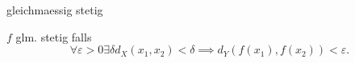 \documentclass[class=article, crop=false]{standalone}
\begin{document}
\begin{zettel}{gleichmaessig stetig}
\begin{flashcard}
    \begin{definition}
        $f$ glm. stetig falls
        \[
            \forall \varepsilon > 0 \exists \delta d_X (x_1,x_2) < \delta \implies  d_Y (f (x_1 ), f(x_2 )) < \varepsilon 
        .\]
    \end{definition}
\end{flashcard}
\end{zettel}
\end{document}
